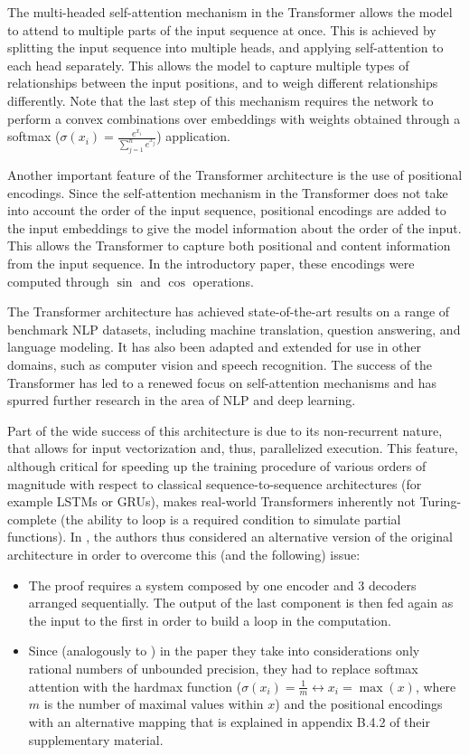 \documentclass{article}
\begin{document}
The multi-headed self-attention mechanism in the Transformer allows the model to attend to multiple parts of the input sequence at once. This is achieved by splitting the input sequence into multiple heads, and applying self-attention to each head separately. This allows the model to capture multiple types of relationships between the input positions, and to weigh different relationships differently. Note that the last step of this mechanism requires the network to perform a convex combinations over embeddings with weights obtained through a softmax ($\sigma(x_i) = \frac{e^{x_i}}{\sum_{j=1}^{n} e^{x_j}}$) application.

Another important feature of the Transformer architecture is the use of positional encodings. Since the self-attention mechanism in the Transformer does not take into account the order of the input sequence, positional encodings are added to the input embeddings to give the model information about the order of the input. This allows the Transformer to capture both positional and content information from the input sequence. In the introductory paper, these encodings were computed through $\sin$ and $\cos$ operations.

The Transformer architecture has achieved state-of-the-art results on a range of benchmark NLP datasets, including machine translation, question answering, and language modeling. It has also been adapted and extended for use in other domains, such as computer vision and speech recognition. The success of the Transformer has led to a renewed focus on self-attention mechanisms and has spurred further research in the area of NLP and deep learning.

Part of the wide success of this architecture is due to its non-recurrent nature, that allows for input vectorization and, thus, parallelized execution. This feature, although critical for speeding up the training procedure of various orders of magnitude with respect to classical sequence-to-sequence architectures (for example LSTMs or GRUs), makes real-world Transformers inherently not Turing-complete (the ability to loop is a required condition to simulate partial functions). In \cite{PER19}, the authors thus considered an alternative version of the original architecture in order to overcome this (and the following) issue:

\begin{itemize}
    \item The proof requires a system composed by one encoder and 3 decoders arranged sequentially. The output of the last component is then fed again as the input to the first in order to build a loop in the computation.
    \item Since (analogously to \cite{SIE95}) in the paper they take into considerations only rational numbers of unbounded precision, they had to replace softmax attention with the hardmax function ($\sigma(x_i)=\frac{1}{m} \leftrightarrow x_i = \max(x)$, where $m$ is the number of maximal values within $x$) and the positional encodings with an alternative mapping that is explained in appendix B.4.2 of their supplementary material. 
\end{itemize}
\end{document}
